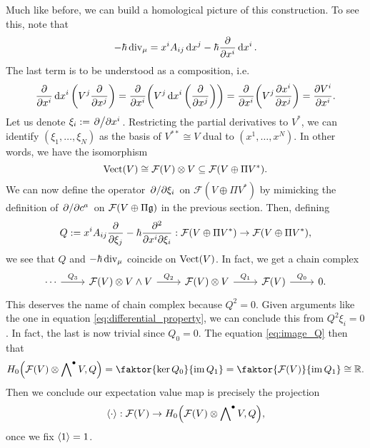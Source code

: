 Much like before, we can build a homological picture of this construction. To see this, note that
\begin{equation}
-\hbar\operatorname{div}_\mu=x^i A_{ij}\dd{x}^j-\hbar\pdv{x^i}\dd{x^i}.
\end{equation}
The last term is to be understood as a composition, i.e.
\begin{equation}
\pdv{x^i}\dd{x^i}\qty(V^j\pdv{x^j})=\pdv{x^i}\qty(V^j\dd{x^i}\qty(\pdv{x^j}))=\pdv{x^i}\qty(V^j\pdv{x^i}{x^j})=\pdv{V^i}{x^i}.
\end{equation}
Let us denote $\xi_i:=\pdv*{x^i}$. Restricting the partial derivatives to $V^*$, we can identify $(\xi_1,\dots,\xi_N)$ as the basis of $V^{**}\cong V$ dual to $(x^1,\dots,x^N)$. In other words, we have the isomorphism
\begin{equation}\label{eq:polynomial_vectors}
\operatorname{Vect}(V)\cong \mathcal{F}(V)\otimes V\subseteq\mathcal{F}(V\oplus\Pi V^*).
\end{equation}
We can now define the operator $\pdv*{\xi_i}$ on $\mathcal{F}(V\oplus\Pi V^*)$ by mimicking the definition of $\pdv*{c^a}$ on $\mathcal{F}(V\oplus\Pi \mathfrak{g})$ in the previous section. Then, defining
\begin{equation}
Q:=x^i A_{ij}\pdv{\xi_j}-\hbar\pdv{}{x^i}{\xi_i}:\mathcal{F}(V\oplus\Pi V^*)\rightarrow\mathcal{F}(V\oplus\Pi V^*),
\end{equation}
we see that $Q$ and $-\hbar\operatorname{div}_\mu$ coincide on $\operatorname{Vect}(V)$. In fact, we get a chain complex 
\begin{equation}
\begin{tikzcd}
\cdots\arrow[r,"Q_3"]&\mathcal{F}(V)\otimes V\wedge V\arrow[r,"Q_2"]&\mathcal{F}(V)\otimes V \arrow[r,"Q_1"]&\mathcal{F}(V)\arrow[r,"Q_0"]& 0.
\end{tikzcd}
\end{equation}
This deserves the name of chain complex because $Q^2=0$. Given arguments like the one in equation \eqref{eq:differential_property}, we can conclude this from $Q^2\xi_i=0$. In fact, the last is now trivial since $Q_0=0$. The equation \eqref{eq:image_Q} then that
\begin{equation}
H_0\qty(\mathcal{F}(V)\otimes\bigwedge\nolimits^\bullet V,Q)=\faktor{\ker Q_0}{\im Q_1}=\faktor{\mathcal{F}(V)}{\im Q_1}\cong\mathbb{R}.
\end{equation}
Then we conclude our expectation value map is precisely the projection
\begin{equation}
\ev{\cdot}:\mathcal{F}(V)\rightarrow H_0\qty(\mathcal{F}(V)\otimes\bigwedge\nolimits^\bullet V,Q),
\end{equation}
once we fix $\ev{1}=1$.

